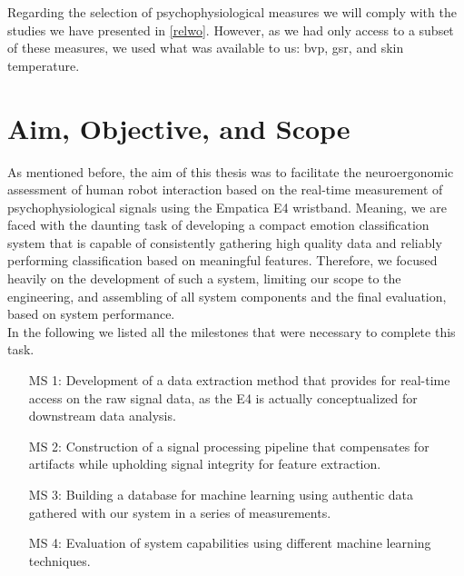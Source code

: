 Regarding the selection of psychophysiological measures we will comply with the studies we have presented in \ref{relwo}. However, as we had only access to a subset of these measures, we used what was available to us: \gls{bvp}, \gls{gsr}, and skin temperature.
\newpage
\section{Aim, Objective, and Scope}
As mentioned before, the aim of this thesis was to facilitate the neuroergonomic assessment of human robot interaction based on the real-time measurement of psychophysiological signals using the Empatica E4 wristband. 
Meaning, we are faced with the daunting task of developing a compact emotion classification system that is capable of consistently gathering high quality data and reliably performing classification based on meaningful features.
Therefore, we focused heavily on the development of such a system, limiting our scope to the engineering, and assembling of all system components and the final evaluation, based on system performance.\\
In the following we listed all the milestones that were necessary to complete this task.

\begin{center}
\begin{enumerate}
\item[MS 1:] Development of a data extraction method that provides for real-time access on the raw signal data, as the E4 is actually conceptualized for downstream data analysis.
\item[MS 2:] Construction of a signal processing pipeline that compensates for artifacts while upholding signal integrity for feature extraction.
\item[MS 3:] Building a database for machine learning using authentic data gathered with our system in a series of measurements. 
\item[MS 4:] Evaluation of system capabilities using different machine learning techniques.
\end{enumerate}
\end{center}

